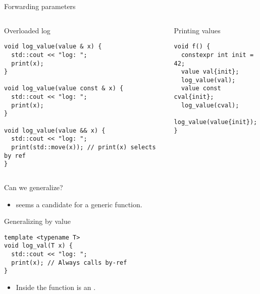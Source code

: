 \begin{frame}[t,fragile]{Forwarding parameters}
\begin{columns}[T]

\begin{block}{Overloaded log}
\begin{lstlisting}
void log_value(value & x) {
  std::cout << "log: ";
  print(x);
}

void log_value(value const & x) {
  std::cout << "log: ";
  print(x);
}

void log_value(value && x) {
  std::cout << "log: ";
  print(std::move(x)); // print(x) selects by ref
}
\end{lstlisting}
\end{block}

\pause
{}
\begin{block}{Printing values}
\begin{lstlisting}
void f() {
  constexpr int init = 42;
  value val{init};
  log_value(val);
  value const cval{init};
  log_value(cval);
  log_value(value{init});
}
\end{lstlisting}
\end{block}

\end{columns}

\end{frame}

\begin{frame}[t,fragile]{Can we generalize?}
\begin{itemize}
  \item {} seems a candidate for a generic function.
\end{itemize}

\begin{block}{Generalizing by value}
\begin{lstlisting}
template <typename T>
void log_val(T x) { 
  std::cout << "log: ";
  print(x); // Always calls by-ref
}
\end{lstlisting}
\end{block}

\begin{itemize}
  \item Inside the function  is an .
\end{itemize}

\end{frame}
